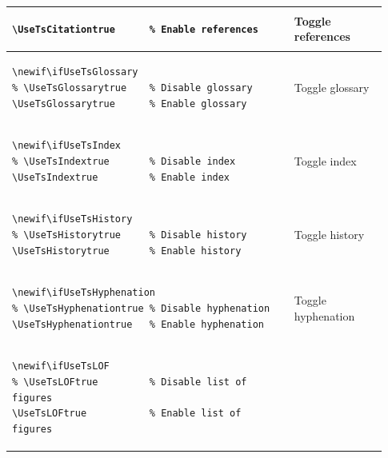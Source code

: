 \begin{footnotesize}
\begin{longtable}{ | p{0.7\linewidth} | p{0.23\linewidth} | }
\begin{BVerbatim}[baseline=t]
% \UseTsCitationtrue    % Disable references
\UseTsCitationtrue      % Enable references
        \end{BVerbatim}
         & Toggle references                                                   \\
        \hline
        \begin{BVerbatim}[baseline=t]
% Switch to enable glossary
\newif\ifUseTsGlossary
% \UseTsGlossarytrue    % Disable glossary
\UseTsGlossarytrue      % Enable glossary
        \end{BVerbatim}
         & Toggle glossary                                                     \\
        \hline
        \begin{BVerbatim}[baseline=t]
% Switch to enable index
\newif\ifUseTsIndex
% \UseTsIndextrue       % Disable index
\UseTsIndextrue         % Enable index
        \end{BVerbatim}
         & Toggle index                                                        \\
        \hline
        \begin{BVerbatim}[baseline=t]
% Switch to enable history
\newif\ifUseTsHistory
% \UseTsHistorytrue     % Disable history
\UseTsHistorytrue       % Enable history
        \end{BVerbatim}
         & Toggle history                                                      \\
        \hline
        \begin{BVerbatim}[baseline=t]
% Switch to enable hyphenation
\newif\ifUseTsHyphenation
% \UseTsHyphenationtrue % Disable hyphenation
\UseTsHyphenationtrue   % Enable hyphenation
        \end{BVerbatim}
         & Toggle \newline hyphenation                                         \\
        \hline
        \begin{BVerbatim}[baseline=t]
% Switch to enable list of figures
\newif\ifUseTsLOF
% \UseTsLOFtrue         % Disable list of figures
\UseTsLOFtrue           % Enable list of figures

\end{BVerbatim}
\end{longtable}
\end{footnotesize}
